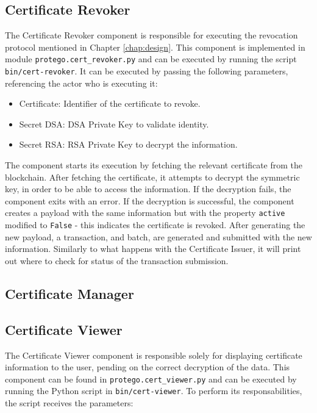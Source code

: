 \subsection{Certificate Revoker}

The Certificate Revoker component is responsible for executing the revocation protocol mentioned in Chapter \ref{chap:design}. This component is implemented in module \texttt{protego.cert\_revoker.py} and can be executed by running the script \texttt{bin/cert-revoker}. It can be executed by passing the following parameters, referencing the actor who is executing it:

\begin{itemize}
    \item Certificate: Identifier of the certificate to revoke.
    \item Secret DSA: DSA Private Key to validate identity.
    \item Secret RSA: RSA Private Key to decrypt the information.
\end{itemize}

The component starts its execution by fetching the relevant certificate from the blockchain. After fetching the certificate, it attempts to decrypt the symmetric key, in order to be able to access the information. If the decryption fails, the component exits with an error. If the decryption is successful, the component creates a payload with the same information but with the property \texttt{active} modified to \texttt{False} - this indicates the certificate is revoked. After generating the new payload, a transaction, and batch, are generated and submitted with the new information. Similarly to what happens with the Certificate Issuer, it will print out where to check for status of the transaction submission.

\subsection{Certificate Manager}

\subsection{Certificate Viewer}

The Certificate Viewer component is responsible solely for displaying certificate information to the user, pending on the correct decryption of the data.  This component can be found in \texttt{protego.cert\_viewer.py} and can be executed by running the Python script in \texttt{bin/cert-viewer}. To perform its responsabilities, the script receives the parameters:

